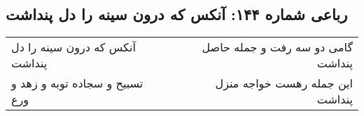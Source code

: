 \begin{center}
\section*{رباعی شماره ۱۴۴: آنکس که درون سینه را دل پنداشت}
\label{sec:0144}
\begin{longtable}{l p{0.5cm} r}
آنکس که درون سینه را دل پنداشت
&&
گامی دو سه رفت و جمله حاصل پنداشت
\\
تسبیح و سجاده توبه و زهد و ورع
&&
این جمله رهست خواجه منزل پنداشت
\\
\end{longtable}
\end{center}
